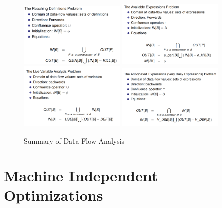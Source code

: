 \documentclass{article}
\begin{document}
\begin{figure}[h]
    \centering
    \includegraphics[width=0.45\textwidth]{Images/summary1.png}
    \includegraphics[width=0.45\textwidth]{Images/summary2.png}
    \includegraphics[width=0.45\textwidth]{Images/summary3.png}
    \includegraphics[width=0.45\textwidth]{Images/summary4.png}
    \caption{Summary of Data Flow Analysis}
    \label{fig:AnticipatedExpressions}
\end{figure}

\newpage

\section*{Machine Independent Optimizations}
\end{document}

